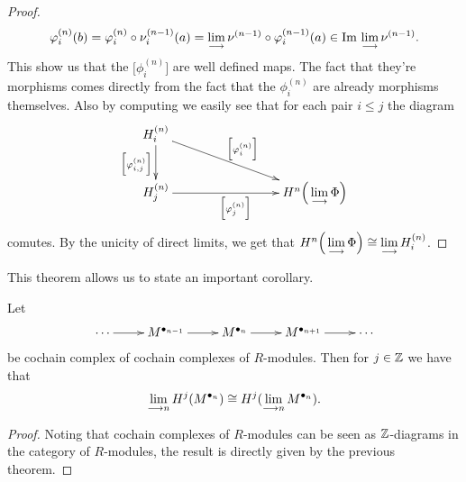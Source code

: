 \documentclass[11pt, a4paper, twoside]{article}
\begin{document}
\begin{proof}
    \begin{displaymath}
        \varphi^{(n)}_i(b)=\varphi^{(n)}_i\circ\nu^{(n-1)}_i(a)=\lim\limits_{\longrightarrow}\nu^{(n-1)}\circ\varphi^{(n-1)}_i(a)\in\mathrm{Im}\thinspace\lim\limits_{\longrightarrow}\nu^{(n-1)}.
    \end{displaymath}
    This show us that the $\Big[\phi_i^{(n)}\Big]$ are well defined maps. The fact that they're morphisms comes directly from the fact that the $\phi_i^{(n)}$ are already morphisms themselves. Also by computing we easily see that for each pair $i\leq j$ the diagram
    \begin{displaymath}
        \xymatrix{
            H_i^{(n)}\ar[d]_{\Big[\phi_{i,j}^{(n)}\Big]}\ar[rrrd]^{\Big[\phi^{(n)}_i\Big]}\\
            H_j^{(n)}\ar[rrr]_{\Big[\phi_j^{(n)}\Big]} & & &  H^n\Big(\lim\limits_{\ra}\Phi\Big)\\
        }
    \end{displaymath}
    comutes. By the unicity of direct limits, we get that $H^n\Big(\lim\limits_{\longrightarrow}\Phi\Big)\cong\lim\limits_{\longrightarrow}H^{(n)}_i$.
\end{proof}
This theorem allows us to state an important corollary.
\begin{cor}
Let 
\begin{displaymath}
    \xymatrix{
        \cdots\ar[r] & M^{\bullet_{n-1}}\ar[r] & M^{\bullet_n}\ar[r] & M^{\bullet_{n+1}}\ar[r] & \cdots
    }
\end{displaymath}
be cochain complex of cochain complexes of $R$-modules. Then for $j\in\mathbb{Z}$ we have that 
\begin{displaymath}
    \lim\limits_{\longrightarrow n}H^j(M^{\bullet_n})\cong H^j(\lim\limits_{\longrightarrow n}M^{\bullet_n}).
\end{displaymath}
\end{cor}
\begin{proof}
    Noting that cochain complexes of $R$-modules can be seen as $\mathbb{Z}$-diagrams in the category of $R$-modules, the result is directly given by the previous theorem. 
\end{proof}
\end{document}
